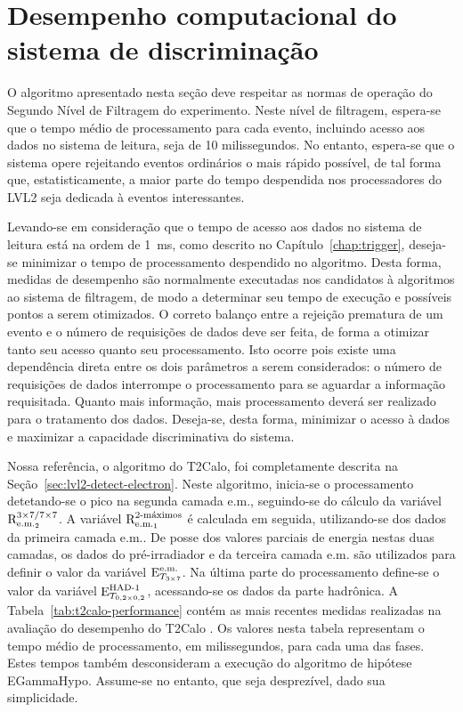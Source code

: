 \typeout{ ====================================================================}
\typeout{ ====================================================================}

\chapter{Desempenho computacional do sistema de discriminação}
\label{chap:implement}

O algoritmo apresentado nesta seção deve respeitar as normas de operação do
Segundo Nível de Filtragem do experimento. Neste nível de filtragem, espera-se
que o tempo médio de processamento para cada evento, incluindo acesso aos
dados no sistema de leitura, seja de 10 milissegundos. No entanto, espera-se
que o sistema opere rejeitando eventos ordinários o mais rápido possível, de
tal forma que, estatisticamente, a maior parte do tempo despendida nos
processadores do LVL2 seja dedicada à eventos interessantes.

Levando-se em consideração que o tempo de acesso aos dados no sistema de
leitura está na ordem de 1~ms, como descrito no Capítulo~\ref{chap:trigger},
deseja-se minimizar o tempo de processamento despendido no algoritmo. Desta
forma, medidas de desempenho são normalmente executadas nos candidatos à
algoritmos ao sistema de filtragem, de modo a determinar seu tempo de execução
e possíveis pontos a serem otimizados. O correto balanço entre a rejeição
prematura de um evento e o número de requisições de dados deve ser feita, de
forma a otimizar tanto seu acesso quanto seu processamento. Isto ocorre pois
existe uma dependência direta entre os dois parâmetros a serem considerados: o
número de requisições de dados interrompe o processamento para se aguardar a
informação requisitada. Quanto mais informação, mais processamento deverá ser
realizado para o tratamento dos dados. Deseja-se, desta forma, minimizar o
acesso à dados e maximizar a capacidade discriminativa do sistema.

Nossa referência, o algoritmo do T2Calo, foi completamente descrita na
Seção~\ref{sec:lvl2-detect-electron}. Neste algoritmo, inicia-se o
processamento detetando-se o pico na segunda camada e.m., seguindo-se do
cálculo da variável $\rcore$. A variável $\eratio$ é calculada em seguida,
utilizando-se dos dados da primeira camada e.m.. De posse dos valores parciais
de energia nestas duas camadas, os dados do pré-irradiador e da terceira
camada e.m. são utilizados para definir o valor da variável $\etem$. Na última
parte do processamento define-se o valor da variável $\ethad$, acessando-se os
dados da parte hadrônica. A Tabela~\ref{tab:t2calo-performance} contém as mais
recentes medidas realizadas na avaliação do desempenho do T2Calo
\cite{denis-presentation}. Os valores nesta tabela representam o tempo médio
de processamento, em milissegundos, para cada uma das fases. Estes tempos
também desconsideram a execução do algoritmo de hipótese EGammaHypo. Assume-se
no entanto, que seja desprezível, dado sua simplicidade.


